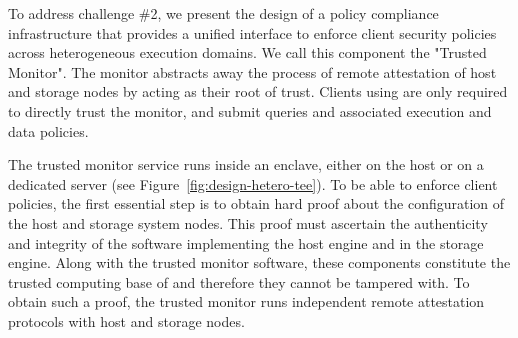 To address challenge \#2, we present the design of a policy compliance infrastructure that provides a unified interface to enforce client security policies across heterogeneous execution domains. We call this component the "Trusted Monitor". The monitor abstracts away the process of remote attestation of host and storage nodes by acting as their root of trust. Clients using \project{} are only required to directly trust the monitor, and submit queries and associated execution and data policies.





The trusted monitor service runs inside an enclave, either on the host or on a dedicated server (see Figure~\ref{fig:design-hetero-tee}). To be able to enforce client policies, the first essential step is to obtain hard proof about the configuration of the host and storage system nodes. This proof must ascertain the authenticity and integrity of the software implementing the host engine and in the storage engine. Along with the trusted monitor software, these components constitute the trusted computing base of \project{} and therefore they cannot be tampered with. To obtain such a proof, the trusted monitor runs independent remote attestation protocols with host and storage nodes.

